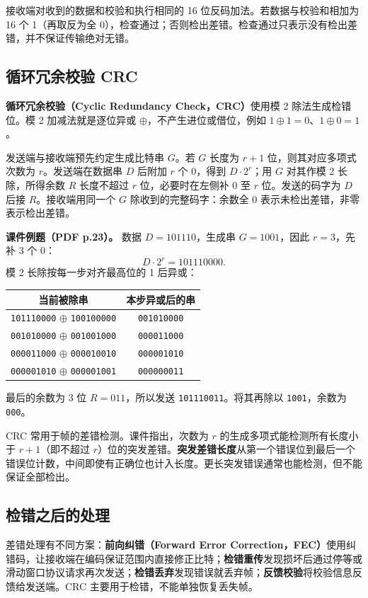 接收端对收到的数据和校验和执行相同的 16 位反码加法。若数据与校验和相加为 16 个 1（再取反为全 0），检查通过；否则检出差错。检查通过只表示没有检出差错，并不保证传输绝对无错。


\subsection{循环冗余校验 CRC}
\textbf{循环冗余校验（Cyclic Redundancy Check，CRC）}使用模 2 除法生成检错位。模 2 加减法就是逐位异或 $\oplus$，不产生进位或借位，例如 $1\oplus1=0$、$1\oplus0=1$。

发送端与接收端预先约定生成比特串 $G$。若 $G$ 长度为 $r+1$ 位，则其对应多项式次数为 $r$。发送端在数据串 $D$ 后附加 $r$ 个 0，得到 $D\cdot 2^r$；用 $G$ 对其作模 2 长除，所得余数 $R$ 长度不超过 $r$ 位，必要时在左侧补 0 至 $r$ 位。发送的码字为 $D$ 后接 $R$。接收端用同一个 $G$ 除收到的完整码字：余数全 0 表示未检出差错，非零表示检出差错。

\textbf{课件例题（PDF p.23）。} 数据 $D=101110$，生成串 $G=1001$，因此 $r=3$，先补 3 个 0：
\[
 D\cdot 2^r=101110000.
\]
模 2 长除按每一步对齐最高位的 1 后异或：
\begin{center}
\begin{tabular}{c c}
\toprule
当前被除串 & 本步异或后的串\\
\midrule
\texttt{101110000} $\oplus$ \texttt{100100000} & \texttt{001010000}\\
\texttt{001010000} $\oplus$ \texttt{001001000} & \texttt{000011000}\\
\texttt{000011000} $\oplus$ \texttt{000010010} & \texttt{000001010}\\
\texttt{000001010} $\oplus$ \texttt{000001001} & \texttt{000000011}\\
\bottomrule
\end{tabular}
\end{center}
最后的余数为 3 位 $R=011$，所以发送 \texttt{101110011}。将其再除以 \texttt{1001}，余数为 \texttt{000}。

CRC 常用于帧的差错检测。课件指出，次数为 $r$ 的生成多项式能检测所有长度小于 $r+1$（即不超过 $r$）位的突发差错。\textbf{突发差错长度}从第一个错误位到最后一个错误位计数，中间即使有正确位也计入长度。更长突发错误通常也能检测，但不能保证全部检出。


\subsection{检错之后的处理}
差错处理有不同方案：\textbf{前向纠错（Forward Error Correction，FEC）}使用纠错码，让接收端在编码保证范围内直接修正比特；\textbf{检错重传}发现损坏后通过停等或滑动窗口协议请求再次发送；\textbf{检错丢弃}发现错误就丢弃帧；\textbf{反馈校验}将校验信息反馈给发送端。CRC 主要用于检错，不能单独恢复丢失帧。

